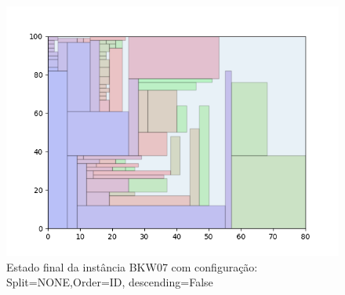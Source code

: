 \begin{figure}[H]
    \centering
    \caption[]{Estado final da instância BKW07 com configuração: Split=NONE,Order=ID, descending=False}
    \label{fig:bkw07-none-id-false}
    \includegraphics[scale=0.5]{output/figures/bkw/bkw07/none/id/false/00}
\end{figure}